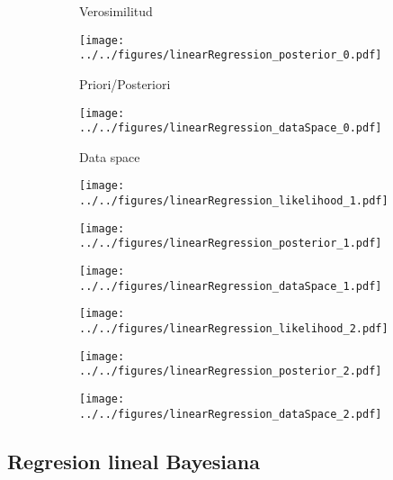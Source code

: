 \documentclass[shownotes]{beamer}
\begin{document}
\begin{frame}

\vspace{-1cm}
 \begin{figure}

\begin{subfigure}[t]{0.32\textwidth} 
\caption*{Verosimilitud} 
\end{subfigure}
\begin{subfigure}[t]{0.32\textwidth}
\caption*{Priori/Posteriori} 
\texttt{[image: ../../figures/linearRegression\_posterior\_0.pdf]} 
\end{subfigure}
\begin{subfigure}[t]{0.32\textwidth}
\caption*{Data space} 
\texttt{[image: ../../figures/linearRegression\_dataSpace\_0.pdf]} 
\end{subfigure}


\begin{subfigure}[c]{0.32\textwidth}
\texttt{[image: ../../figures/linearRegression\_likelihood\_1.pdf]} 
\end{subfigure}
\begin{subfigure}[c]{0.32\textwidth}
\texttt{[image: ../../figures/linearRegression\_posterior\_1.pdf]} 
\end{subfigure}
\begin{subfigure}[c]{0.32\textwidth}
\texttt{[image: ../../figures/linearRegression\_dataSpace\_1.pdf]} 
\end{subfigure}

\begin{subfigure}[c]{0.32\textwidth}
\texttt{[image: ../../figures/linearRegression\_likelihood\_2.pdf]} 
\end{subfigure}
\begin{subfigure}[c]{0.32\textwidth}
\texttt{[image: ../../figures/linearRegression\_posterior\_2.pdf]} 
\end{subfigure}
\begin{subfigure}[c]{0.32\textwidth}
\texttt{[image: ../../figures/linearRegression\_dataSpace\_2.pdf]} 
\end{subfigure}

\end{figure}

\end{frame}


\subsection{Regresion lineal Bayesiana}
\end{document}
